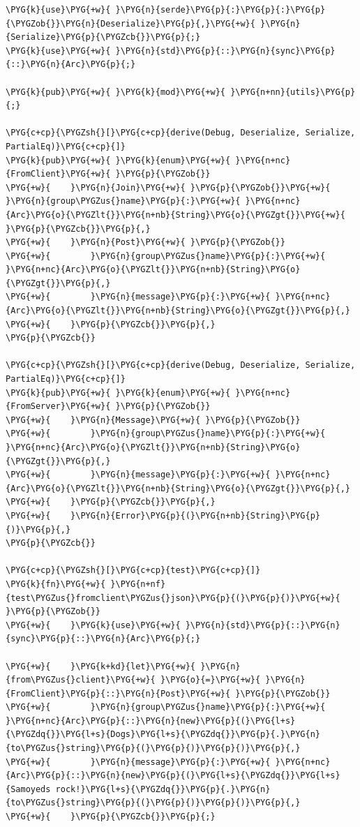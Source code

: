 \begin{Verbatim}[commandchars=\\\{\},breaklines=true,breakanywhere=true,fontsize=\codefont,xleftmargin=17bp]
\PYG{k}{use}\PYG{+w}{ }\PYG{n}{serde}\PYG{p}{:}\PYG{p}{:}\PYG{p}{\PYGZob{}}\PYG{n}{Deserialize}\PYG{p}{,}\PYG{+w}{ }\PYG{n}{Serialize}\PYG{p}{\PYGZcb{}}\PYG{p}{;}
\PYG{k}{use}\PYG{+w}{ }\PYG{n}{std}\PYG{p}{::}\PYG{n}{sync}\PYG{p}{::}\PYG{n}{Arc}\PYG{p}{;}

\PYG{k}{pub}\PYG{+w}{ }\PYG{k}{mod}\PYG{+w}{ }\PYG{n+nn}{utils}\PYG{p}{;}

\PYG{c+cp}{\PYGZsh{}[}\PYG{c+cp}{derive(Debug, Deserialize, Serialize, PartialEq)}\PYG{c+cp}{]}
\PYG{k}{pub}\PYG{+w}{ }\PYG{k}{enum}\PYG{+w}{ }\PYG{n+nc}{FromClient}\PYG{+w}{ }\PYG{p}{\PYGZob{}}
\PYG{+w}{    }\PYG{n}{Join}\PYG{+w}{ }\PYG{p}{\PYGZob{}}\PYG{+w}{ }\PYG{n}{group\PYGZus{}name}\PYG{p}{:}\PYG{+w}{ }\PYG{n+nc}{Arc}\PYG{o}{\PYGZlt{}}\PYG{n+nb}{String}\PYG{o}{\PYGZgt{}}\PYG{+w}{ }\PYG{p}{\PYGZcb{}}\PYG{p}{,}
\PYG{+w}{    }\PYG{n}{Post}\PYG{+w}{ }\PYG{p}{\PYGZob{}}
\PYG{+w}{        }\PYG{n}{group\PYGZus{}name}\PYG{p}{:}\PYG{+w}{ }\PYG{n+nc}{Arc}\PYG{o}{\PYGZlt{}}\PYG{n+nb}{String}\PYG{o}{\PYGZgt{}}\PYG{p}{,}
\PYG{+w}{        }\PYG{n}{message}\PYG{p}{:}\PYG{+w}{ }\PYG{n+nc}{Arc}\PYG{o}{\PYGZlt{}}\PYG{n+nb}{String}\PYG{o}{\PYGZgt{}}\PYG{p}{,}
\PYG{+w}{    }\PYG{p}{\PYGZcb{}}\PYG{p}{,}
\PYG{p}{\PYGZcb{}}

\PYG{c+cp}{\PYGZsh{}[}\PYG{c+cp}{derive(Debug, Deserialize, Serialize, PartialEq)}\PYG{c+cp}{]}
\PYG{k}{pub}\PYG{+w}{ }\PYG{k}{enum}\PYG{+w}{ }\PYG{n+nc}{FromServer}\PYG{+w}{ }\PYG{p}{\PYGZob{}}
\PYG{+w}{    }\PYG{n}{Message}\PYG{+w}{ }\PYG{p}{\PYGZob{}}
\PYG{+w}{        }\PYG{n}{group\PYGZus{}name}\PYG{p}{:}\PYG{+w}{ }\PYG{n+nc}{Arc}\PYG{o}{\PYGZlt{}}\PYG{n+nb}{String}\PYG{o}{\PYGZgt{}}\PYG{p}{,}
\PYG{+w}{        }\PYG{n}{message}\PYG{p}{:}\PYG{+w}{ }\PYG{n+nc}{Arc}\PYG{o}{\PYGZlt{}}\PYG{n+nb}{String}\PYG{o}{\PYGZgt{}}\PYG{p}{,}
\PYG{+w}{    }\PYG{p}{\PYGZcb{}}\PYG{p}{,}
\PYG{+w}{    }\PYG{n}{Error}\PYG{p}{(}\PYG{n+nb}{String}\PYG{p}{)}\PYG{p}{,}
\PYG{p}{\PYGZcb{}}

\PYG{c+cp}{\PYGZsh{}[}\PYG{c+cp}{test}\PYG{c+cp}{]}
\PYG{k}{fn}\PYG{+w}{ }\PYG{n+nf}{test\PYGZus{}fromclient\PYGZus{}json}\PYG{p}{(}\PYG{p}{)}\PYG{+w}{ }\PYG{p}{\PYGZob{}}
\PYG{+w}{    }\PYG{k}{use}\PYG{+w}{ }\PYG{n}{std}\PYG{p}{::}\PYG{n}{sync}\PYG{p}{::}\PYG{n}{Arc}\PYG{p}{;}

\PYG{+w}{    }\PYG{k+kd}{let}\PYG{+w}{ }\PYG{n}{from\PYGZus{}client}\PYG{+w}{ }\PYG{o}{=}\PYG{+w}{ }\PYG{n}{FromClient}\PYG{p}{::}\PYG{n}{Post}\PYG{+w}{ }\PYG{p}{\PYGZob{}}
\PYG{+w}{        }\PYG{n}{group\PYGZus{}name}\PYG{p}{:}\PYG{+w}{ }\PYG{n+nc}{Arc}\PYG{p}{::}\PYG{n}{new}\PYG{p}{(}\PYG{l+s}{\PYGZdq{}}\PYG{l+s}{Dogs}\PYG{l+s}{\PYGZdq{}}\PYG{p}{.}\PYG{n}{to\PYGZus{}string}\PYG{p}{(}\PYG{p}{)}\PYG{p}{)}\PYG{p}{,}
\PYG{+w}{        }\PYG{n}{message}\PYG{p}{:}\PYG{+w}{ }\PYG{n+nc}{Arc}\PYG{p}{::}\PYG{n}{new}\PYG{p}{(}\PYG{l+s}{\PYGZdq{}}\PYG{l+s}{Samoyeds rock!}\PYG{l+s}{\PYGZdq{}}\PYG{p}{.}\PYG{n}{to\PYGZus{}string}\PYG{p}{(}\PYG{p}{)}\PYG{p}{)}\PYG{p}{,}
\PYG{+w}{    }\PYG{p}{\PYGZcb{}}\PYG{p}{;}


\end{Verbatim}
